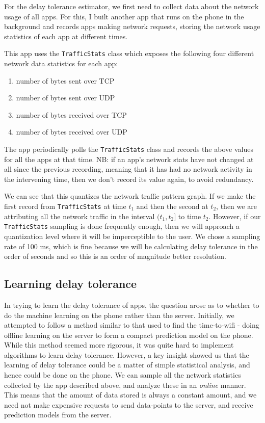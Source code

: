 \documentclass[12pt, fleqn]{article}
\begin{document}
For the delay tolerance estimator, we first need to collect data about the 
network usage of all apps. For this, I built another app that runs on the phone 
in the background and records apps making network requests, storing the 
network usage statistics of each app at different times. 

This app uses the \texttt{TrafficStats} class which exposes the following four different network 
data statistics for each app:
\begin{enumerate}
  \item number of bytes sent over TCP
  \item number of bytes sent over UDP
  \item number of bytes received over TCP
  \item number of bytes received over UDP
\end{enumerate}

The app periodically polls the \texttt{TrafficStats} class and records the above
values for all the apps at that time. NB: if an app's network stats have not 
changed at all since the previous recording, meaning that it has had no network 
activity in the intervening time, then we don't record its value again, to avoid 
redundancy. 

We can see that this quantizes the network traffic pattern graph. If we make the 
first record from \texttt{TrafficStats} at time $t_1$ and then the second at 
$t_2$, then we are attributing all the network traffic in the interval $(t_1, t_2]$ 
to time $t_2$. However, if our \texttt{TrafficStats} sampling is done frequently 
enough, then we will approach a quantization level where it will be imperceptible to the 
user. We chose a sampling rate of 100 ms, which is fine because we will be 
calculating delay tolerance in the order of seconds and so this is an order of 
magnitude better resolution.  

\subsection{Learning delay tolerance}

In trying to learn the delay tolerance of apps, the question arose as to whether to do the machine learning on the phone 
rather than the server. Initially, we attempted to follow a method similar to that
used to find the time-to-wifi - doing offline learning on the server to form a compact 
prediction model on the phone. While this method seemed more rigorous, it was
quite hard to implement algorithms to learn delay tolerance. However, a key insight
showed us that the learning of delay tolerance could be a matter of simple statistical 
analysis, and hence could be done on the phone. We can sample all the network
statistics collected by the app described above, and analyze these in an \emph{online} 
manner. This means that the amount of data stored is always a constant amount, 
and we need not make expensive requests to send data-points to the server, and 
receive prediction models from the server. 
\end{document}
